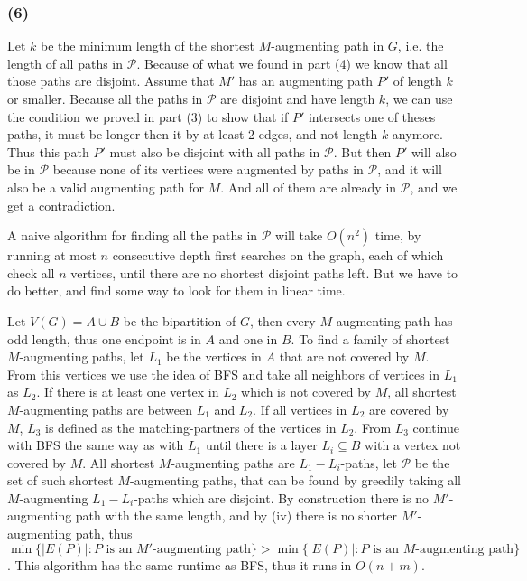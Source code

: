 \documentclass{article}
\begin{document}
  \subsubsection*{(6)} Let $k$ be the minimum length of the shortest $M$-augmenting path in $G$, i.e. the length of all paths in $\mathcal{P}$. Because of what we found in part (4) we know that all those paths are disjoint.
  Assume that $M'$ has an augmenting path $P'$ of length $k$ or smaller. Because all the paths in $\mathcal{P}$ are disjoint and have length $k$, we can use the condition we proved in part (3) to show that if $P'$ intersects one of theses paths, it must be longer then it by at least 2 edges, and not length $k$ anymore. Thus this path $P'$ must also be disjoint with all paths in $\mathcal{P}$.
  But then $P'$ will also be in $\mathcal{P}$ because none of its vertices were augmented by paths in $\mathcal{P}$, and it will also be a valid augmenting path for $M$. And all of them are already in $\mathcal{P}$, and we get a contradiction.

  A naive algorithm for finding all the paths in $\mathcal{P}$ will take $O(n^2)$ time, by running at most $n$ consecutive depth first searches on the graph, each of which check all $n$ vertices, until there are no shortest disjoint paths left. But we have to do better, and find some way to look for them in linear time.


  Let $V(G)=A\cup B$ be the bipartition of $G$, then every $M$-augmenting path has odd length, thus one endpoint is in $A$ and one in $B$. To find a family of shortest $M$-augmenting paths, let $L_1$ be the vertices in $A$ that are not covered by $M$. From this vertices we use the idea of BFS and take all neighbors of vertices in $L_1$ as $L_2$. If there is at least one vertex in $L_2$ which is not covered by $M$, all shortest $M$-augmenting paths are between $L_1$ and $L_2$. If all vertices in $L_2$ are covered by $M$, $L_3$ is defined as the matching-partners of the vertices in $L_2$. From $L_3$ continue with BFS the same way as with $L_1$ until there is a layer $L_i\subseteq B $ with a vertex not covered by $M$. All shortest $M$-augmenting paths are $L_1-L_i$-paths, let $\mathcal{P}$ be the set of such shortest $M$-augmenting paths, that can be found by greedily taking all $M$-augmenting $L_1-L_i$-paths which are disjoint.
  By construction there is no $M'$-augmenting path with the same length, and by (iv) there is no shorter $M'$-augmenting path, thus $\min\{|E(P)|:P \text{ is an $M'$-augmenting path}\}>\min\{|E(P)|:P \text{ is an $M$-augmenting path}\}$. This algorithm has the same runtime as BFS, thus it runs in $O(n+m)$.
\end{document}
